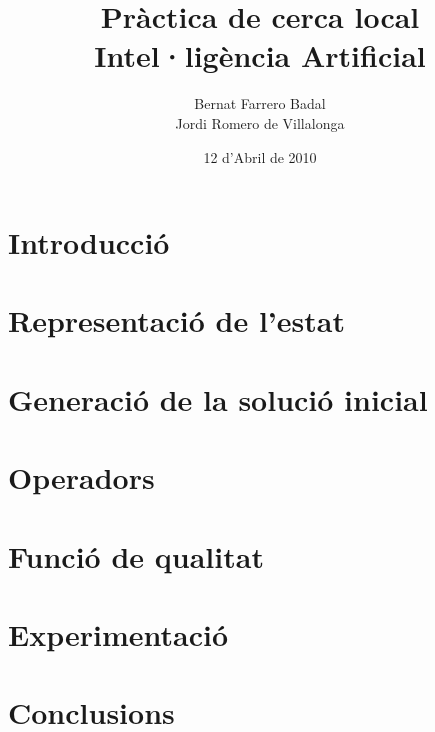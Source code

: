 \documentclass[a4paper]{report}
\author{Bernat Farrero Badal \\Jordi Romero de Villalonga}
\title{Pràctica de cerca local \\ Intel·ligència Artificial}
\date{12 d'Abril de 2010}
\begin{document}
\maketitle

\tableofcontents

\newpage

\chapter{Introducció}


\chapter{Representació de l'estat}


\chapter{Generació de la solució inicial}


\chapter{Operadors}


\chapter{Funció de qualitat}


\chapter{Experimentació}


\chapter{Conclusions}

\end{document}
